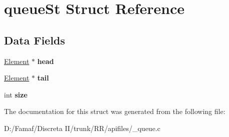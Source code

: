 \hypertarget{structqueue_st}{\section{queue\+St Struct Reference}
\label{structqueue_st}
}
\subsection*{Data Fields}
\begin{DoxyCompactItemize}
\item 
\hypertarget{structqueue_st_a1ebccbd33cd564291a5581373cf5cde7}{\hyperlink{struct_element_st}{Element} $\ast$ {\bfseries head}}\label{structqueue_st_a1ebccbd33cd564291a5581373cf5cde7}

\item 
\hypertarget{structqueue_st_aea790438391999afa2008793c1cdc282}{\hyperlink{struct_element_st}{Element} $\ast$ {\bfseries tail}}\label{structqueue_st_aea790438391999afa2008793c1cdc282}

\item 
\hypertarget{structqueue_st_a439227feff9d7f55384e8780cfc2eb82}{int {\bfseries size}}\label{structqueue_st_a439227feff9d7f55384e8780cfc2eb82}

\end{DoxyCompactItemize}


The documentation for this struct was generated from the following file\+:\begin{DoxyCompactItemize}
\item 
D\+:/\+Famaf/\+Discreta I\+I/trunk/\+R\+R/apifiles/\+\_\+queue.\+c\end{DoxyCompactItemize}
